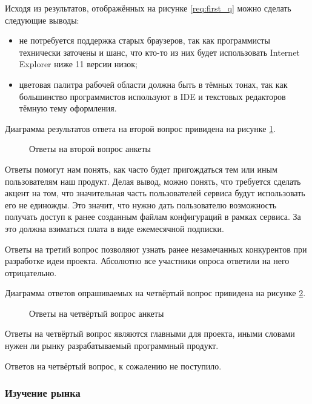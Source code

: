 Исходя из результатов, отображённых на рисунке \ref{req:first_q} можно сделать следующие выводы:
\begin{itemize}
    \item не потребуется поддержка старых браузеров, так как программисты технически заточены и шанс, что кто-то из них будет использовать Internet Explorer ниже 11 версии низок;
    \item цветовая палитра рабочей области должна быть в тёмных тонах, так как большинство программистов используют в IDE и текстовых редакторов тёмную тему оформления.
\end{itemize}

Диаграмма результатов ответа на второй вопрос привидена на рисунке \ref{req:second_q}.

\begin{figure}[H]
    \caption{Ответы на второй вопрос анкеты}
    \label{req:second_q}
\end{figure}

Ответы помогут нам понять, как часто будет пригождаться тем или иным пользователям наш продукт. Делая вывод, можно понять, что
требуется сделать акцент на том, что значительная часть пользователей сервиса будут использовать его не единожды. Это значит, что нужно дать пользователю возможность получать доступ к ранее созданным файлам конфигураций в рамках сервиса. За это должна взиматься плата в виде ежемесячной подписки.

Ответы на третий вопрос позволяют узнать ранее незамечанных конкурентов при разработке идеи проекта. Абсолютно все участники опроса ответили на него отрицательно.

Диаграмма ответов опрашиваемых на четвёртый вопрос привидена на рисунке \ref{req:fourth_q}.

\begin{figure}[H]
    \caption{Ответы на четвёртый вопрос анкеты}
    \label{req:fourth_q}
\end{figure}

Ответы на четвёртый вопрос являются главными для проекта, иными словами нужен ли рынку разрабатываемый программный продукт.

Ответов на четвёртый вопрос, к сожалению не поступило.

\subsubsection{Изучение рынка}

